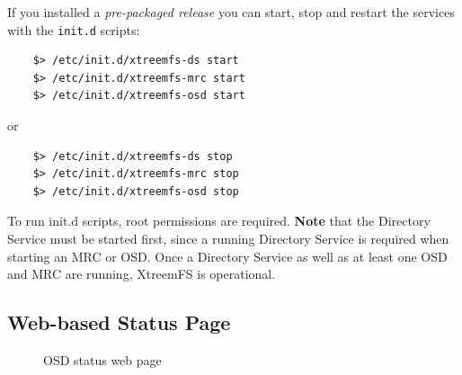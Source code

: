 \documentclass[a4paper,10pt]{book}
\begin{document}
If you installed a \emph{pre-packaged release} you can start, stop and restart the services with the \texttt{init.d} scripts:
	\begin{verbatim}
	$> /etc/init.d/xtreemfs-ds start
	$> /etc/init.d/xtreemfs-mrc start
	$> /etc/init.d/xtreemfs-osd start
	\end{verbatim}
or
	\begin{verbatim}
	$> /etc/init.d/xtreemfs-ds stop
	$> /etc/init.d/xtreemfs-mrc stop
	$> /etc/init.d/xtreemfs-osd stop
	\end{verbatim}


To run init.d scripts, root permissions are required. \textbf{Note} that the Directory Service must be started first, since a running Directory Service is required when starting an MRC or OSD. Once a Directory Service as well as at least one OSD and MRC are running, XtreemFS is operational.

\subsection{Web-based Status Page}

\begin{figure}[h]
 \centering
 \caption{OSD status web page}
 \label{fig:screenshot_status}
\end{figure}
\end{document}
